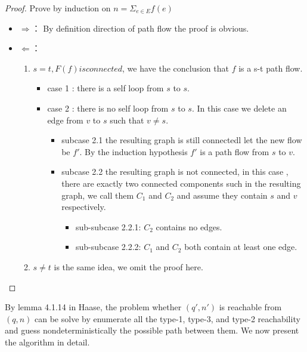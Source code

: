 \documentclass{article}
\newtheorem{proof}{\textit{Proof}}
\begin{document}
\begin{proof} Prove by induction on $n  = \Sigma_{e\in E} f(e)$\\
\begin{itemize}
\item $\Rightarrow$：
 By definition direction of path flow the proof is obvious.

\item $\Leftarrow$：
\begin{enumerate}
\item $s = t, F(f) is connected$, we have the conclusion that $f$ is a s-t path flow.

\begin{itemize}
\item case 1 : there is a self loop from $s$ to $s$.

\item case 2 : there is no self loop from $s$ to $s$. In this case we delete an edge from $v$ to $s$ such that $v \neq s$.

\begin{itemize}
\item subcase 2.1 the resulting graph is still connectedl let the new flow be $f'$. By the induction hypothesis $f'$ is a path flow from $s$ to $v$.

\item subcase 2.2 the resulting graph is not connected, in this case , there are exactly two connected components such in the resulting graph, we call them $C_1$ and $C_2$ and assume they contain $s$ and $v$ respectively.
\begin{itemize}
\item sub-subcase 2.2.1:
$C_2$ contains no edges.

\item sub-subcase 2.2.2:
$C_1$ and $C_2$ both contain at least one edge.

\end{itemize}
\end{itemize}
\end{itemize}

\item $s \ne t$ is the same idea, we omit the proof here.

\end{enumerate}
\end{itemize}


\end{proof}

By lemma 4.1.14 in Haase, the problem whether $(q',n')$ is reachable from $(q,n)$ can be solve by enumerate all the type-1, type-3, and type-2 reachability and guess nondeterministically the possible path between them. We now present the algorithm in detail.
\end{document}
